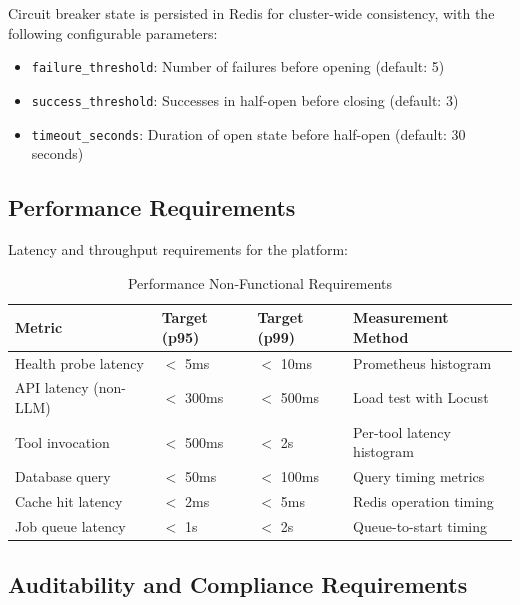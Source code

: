 \documentclass[a4paper,twoside]{sapthesis}
\begin{document}
Circuit breaker state is persisted in Redis for cluster-wide consistency, with the following configurable parameters:
\begin{itemize}
    \item \texttt{failure\_threshold}: Number of failures before opening (default: 5)
    \item \texttt{success\_threshold}: Successes in half-open before closing (default: 3)
    \item \texttt{timeout\_seconds}: Duration of open state before half-open (default: 30 seconds)
\end{itemize}

\subsection{Performance Requirements}
\label{subsec:nfr-performance}

Latency and throughput requirements for the platform:

\begin{table}[htbp]
\centering
\caption{Performance Non-Functional Requirements}
\label{tab:nfr-performance}
\small
\begin{tabularx}{\textwidth}{|l|l|l|X|}
\hline
\textbf{Metric} & \textbf{Target (p95)} & \textbf{Target (p99)} & \textbf{Measurement Method} \\
\midrule
Health probe latency & $<$ 5ms & $<$ 10ms & Prometheus histogram \\
\midrule
API latency (non-LLM) & $<$ 300ms & $<$ 500ms & Load test with Locust \\
\midrule
Tool invocation & $<$ 500ms & $<$ 2s & Per-tool latency histogram \\
\midrule
Database query & $<$ 50ms & $<$ 100ms & Query timing metrics \\
\midrule
Cache hit latency & $<$ 2ms & $<$ 5ms & Redis operation timing \\
\midrule
Job queue latency & $<$ 1s & $<$ 2s & Queue-to-start timing \\
\midrule
\end{tabularx}
\end{table}

\subsection{Auditability and Compliance Requirements}
\label{subsec:nfr-audit}
\end{document}
